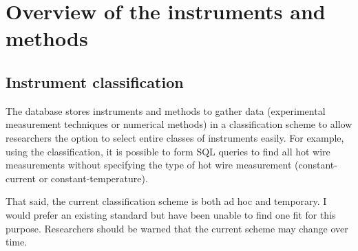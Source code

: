 %
\chapter{Overview of the instruments and methods}
\label{chp:overview-instruments}


\section{Instrument classification}

The database stores instruments and methods to gather data (experimental
measurement techniques or numerical methods) in a classification scheme to
allow researchers the option to select entire classes of instruments easily.
For example, using the classification, it is possible to form SQL queries to
find all hot wire measurements without specifying the type of hot wire
measurement (constant-current or constant-temperature).

That said, the current classification scheme is both ad hoc and temporary.  I
would prefer an existing standard but have been unable to find one fit for this
purpose.  Researchers should be warned that the current scheme may change over
time.



